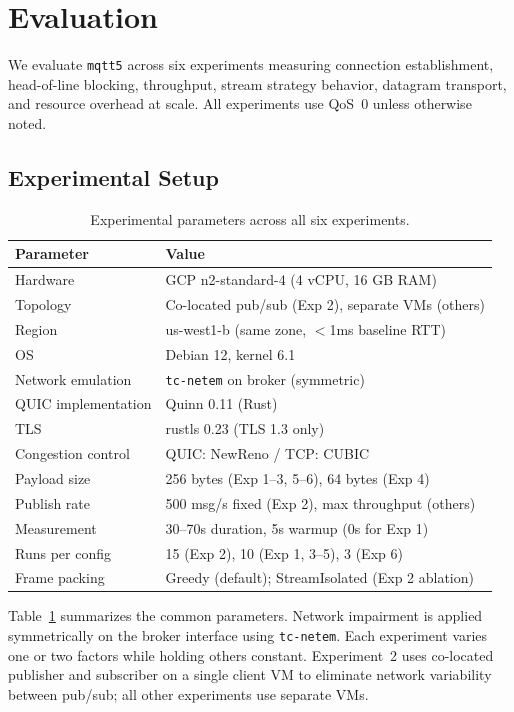 \section{Evaluation}
\label{sec:evaluation}

We evaluate \texttt{mqtt5} across six experiments measuring connection establishment, head-of-line blocking, throughput, stream strategy behavior, datagram transport, and resource overhead at scale. All experiments use QoS~0 unless otherwise noted.

\subsection{Experimental Setup}

\begin{table}[t]
\centering
\caption{Experimental parameters across all six experiments.}
\label{tab:params}
\begin{tabular}{ll}
\toprule
Parameter & Value \\
\midrule
Hardware & GCP n2-standard-4 (4 vCPU, 16 GB RAM) \\
Topology & Co-located pub/sub (Exp 2), separate VMs (others) \\
Region & us-west1-b (same zone, $<$1ms baseline RTT) \\
OS & Debian 12, kernel 6.1 \\
Network emulation & \texttt{tc-netem} on broker (symmetric) \\
QUIC implementation & Quinn 0.11 (Rust) \\
TLS & rustls 0.23 (TLS 1.3 only) \\
Congestion control & QUIC: NewReno / TCP: CUBIC \\
Payload size & 256 bytes (Exp 1--3, 5--6), 64 bytes (Exp 4) \\
Publish rate & 500 msg/s fixed (Exp 2), max throughput (others) \\
Measurement & 30--70s duration, 5s warmup (0s for Exp 1) \\
Runs per config & 15 (Exp 2), 10 (Exp 1, 3--5), 3 (Exp 6) \\
Frame packing & Greedy (default); StreamIsolated (Exp 2 ablation) \\
\bottomrule
\end{tabular}
\end{table}

Table~\ref{tab:params} summarizes the common parameters. Network impairment is applied symmetrically on the broker interface using \texttt{tc-netem}. Each experiment varies one or two factors while holding others constant. Experiment~2 uses co-located publisher and subscriber on a single client VM to eliminate network variability between pub/sub; all other experiments use separate VMs.

